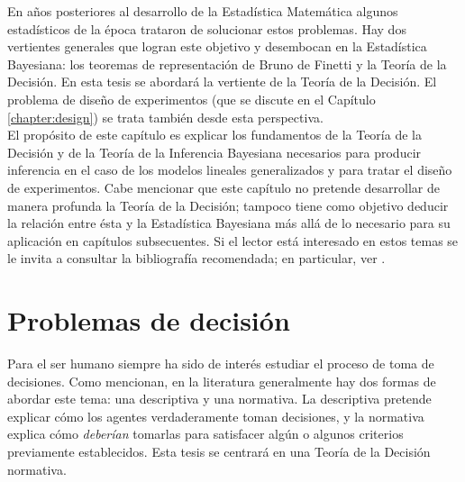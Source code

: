 En años posteriores al desarrollo de la Estadística Matemática algunos estadísticos de la época trataron de solucionar estos problemas. Hay dos vertientes generales que logran este objetivo y desembocan en la Estadística Bayesiana: los teoremas de representación de Bruno de Finetti y la Teoría de la Decisión. En esta tesis se abordará la vertiente de la Teoría de la Decisión. El problema de diseño de experimentos (que se discute en el Capítulo \ref{chapter:design}) se trata también desde esta perspectiva. \\

El propósito de este capítulo es explicar los fundamentos de la Teoría de la Decisión y de la Teoría de la Inferencia Bayesiana necesarios para producir inferencia en el caso de los modelos lineales generalizados y para tratar el diseño de experimentos. Cabe mencionar que este capítulo no pretende desarrollar de manera profunda la Teoría de la Decisión; tampoco tiene como objetivo deducir la relación entre ésta y la Estadística Bayesiana más allá de lo necesario para su aplicación en capítulos subsecuentes. Si el lector está interesado en estos temas se le invita a consultar la bibliografía recomendada; en particular, ver \citep{bernardo_smith, mendoza_pena, notas_bayes}.


\section{Problemas de decisión}

Para el ser humano siempre ha sido de interés estudiar el proceso de toma de decisiones. Como \cite{mendoza_pena} mencionan, en la literatura generalmente hay dos formas de abordar este tema: una descriptiva y una normativa. La descriptiva pretende explicar cómo los agentes verdaderamente toman decisiones, y la normativa explica cómo \textit{deberían} tomarlas para satisfacer algún o algunos criterios previamente establecidos. Esta tesis se centrará en una Teoría de la Decisión normativa.\\

